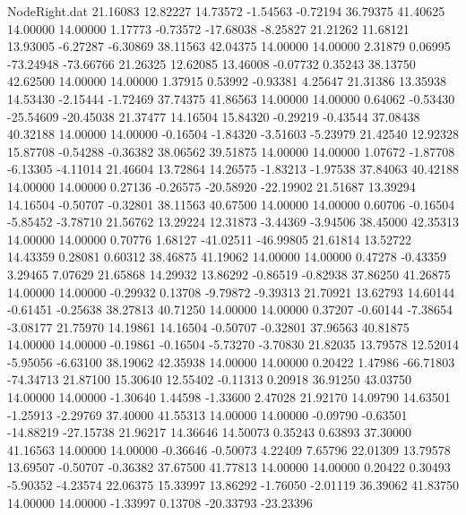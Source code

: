 \begin{filecontents}{NodeRight.dat}
  21.16083   12.82227   14.73572    -1.54563   -0.72194   36.79375   41.40625   14.00000   14.00000    1.17773   -0.73572  -17.68038   -8.25827
  21.21262   11.68121   13.93005    -6.27287   -6.30869   38.11563   42.04375   14.00000   14.00000    2.31879    0.06995  -73.24948  -73.66766
  21.26325   12.62085   13.46008    -0.07732    0.35243   38.13750   42.62500   14.00000   14.00000    1.37915    0.53992   -0.93381    4.25647
  21.31386   13.35938   14.53430    -2.15444   -1.72469   37.74375   41.86563   14.00000   14.00000    0.64062   -0.53430  -25.54609  -20.45038
  21.37477   14.16504   15.84320    -0.29219   -0.43544   37.08438   40.32188   14.00000   14.00000   -0.16504   -1.84320   -3.51603   -5.23979
  21.42540   12.92328   15.87708    -0.54288   -0.36382   38.06562   39.51875   14.00000   14.00000    1.07672   -1.87708   -6.13305   -4.11014
  21.46604   13.72864   14.26575    -1.83213   -1.97538   37.84063   40.42188   14.00000   14.00000    0.27136   -0.26575  -20.58920  -22.19902
  21.51687   13.39294   14.16504    -0.50707   -0.32801   38.11563   40.67500   14.00000   14.00000    0.60706   -0.16504   -5.85452   -3.78710
  21.56762   13.29224   12.31873    -3.44369   -3.94506   38.45000   42.35313   14.00000   14.00000    0.70776    1.68127  -41.02511  -46.99805
  21.61814   13.52722   14.43359     0.28081    0.60312   38.46875   41.19062   14.00000   14.00000    0.47278   -0.43359    3.29465    7.07629
  21.65868   14.29932   13.86292    -0.86519   -0.82938   37.86250   41.26875   14.00000   14.00000   -0.29932    0.13708   -9.79872   -9.39313
  21.70921   13.62793   14.60144    -0.61451   -0.25638   38.27813   40.71250   14.00000   14.00000    0.37207   -0.60144   -7.38654   -3.08177
  21.75970   14.19861   14.16504    -0.50707   -0.32801   37.96563   40.81875   14.00000   14.00000   -0.19861   -0.16504   -5.73270   -3.70830
  21.82035   13.79578   12.52014    -5.95056   -6.63100   38.19062   42.35938   14.00000   14.00000    0.20422    1.47986  -66.71803  -74.34713
  21.87100   15.30640   12.55402    -0.11313    0.20918   36.91250   43.03750   14.00000   14.00000   -1.30640    1.44598   -1.33600    2.47028
  21.92170   14.09790   14.63501    -1.25913   -2.29769   37.40000   41.55313   14.00000   14.00000   -0.09790   -0.63501  -14.88219  -27.15738
  21.96217   14.36646   14.50073     0.35243    0.63893   37.30000   41.16563   14.00000   14.00000   -0.36646   -0.50073    4.22409    7.65796
  22.01309   13.79578   13.69507    -0.50707   -0.36382   37.67500   41.77813   14.00000   14.00000    0.20422    0.30493   -5.90352   -4.23574
  22.06375   15.33997   13.86292    -1.76050   -2.01119   36.39062   41.83750   14.00000   14.00000   -1.33997    0.13708  -20.33793  -23.23396

\end{filecontents}
